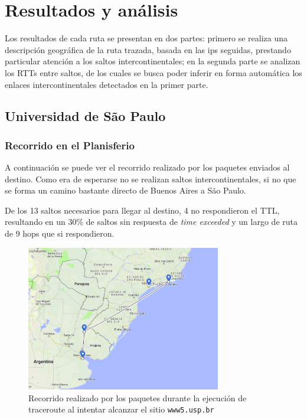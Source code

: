 \section{Resultados y análisis}

Los resultados de cada ruta se presentan en dos partes: primero se realiza una descripción geográfica de la ruta trazada, basada en las ips seguidas, prestando particular atención a los saltos intercontinentales; en la segunda parte se analizan los RTTs entre saltos, de los cuales se busca poder inferir en forma automática los enlaces intercontinentales detectados en la primer parte.

\subsection*{Universidad de São Paulo}

\subsubsection*{Recorrido en el Planisferio}

A continuación se puede ver el recorrido realizado por los paquetes enviados al destino. Como era de esperarse no se realizan saltos intercontinentales, si no que se forma un camino bastante directo de Buenos Aires a São Paulo.

De los 13 saltos necesarios para llegar al destino, 4 no respondieron el TTL, resultando en un 30\% de saltos sin respuesta de \emph{time exceeded} y un largo de ruta de 9 hops que si respondieron.

\begin{figure}[H]
  \centering
  \includegraphics[width=8.5cm]{figs/saopaulo.png}
  \caption{\footnotesize Recorrido realizado por los paquetes durante la ejecución de traceroute al intentar alcanzar el sitio \texttt{www5.usp.br}}
\end{figure}

